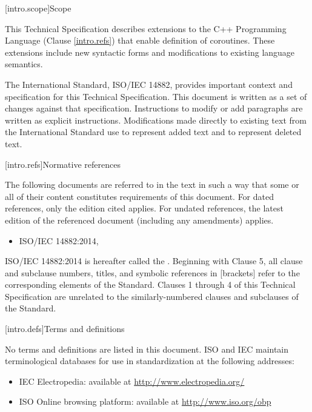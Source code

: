 
[intro.scope]{Scope}

\pnum
This Technical Specification describes extensions to the C++ 
Programming Language (Clause \ref{intro.refs}) that
enable definition of coroutines. These extensions include 
new syntactic forms and modifications to existing language semantics.

\pnum
The International Standard, ISO/IEC 14882, provides important context
and specification for this Technical Specification. This document is 
written as a set of changes against that specification. Instructions
to modify or add paragraphs are written as explicit instructions. 
Modifications made directly to existing text from the International
Standard use  to represent added text and
 to represent deleted text. 

[intro.refs]{Normative references}

\pnum
The following documents are referred to in the text in such a way that some or all of their content constitutes requirements of this document. For dated references, only the edition cited applies. For undated references, the latest edition of the referenced document (including any amendments) applies.

\begin{itemize}
	\item ISO/IEC 14882:2014, 
\end{itemize}

ISO/IEC 14882:2014 is hereafter called the .
%
Beginning with Clause 5, all clause and subclause numbers, titles,
and symbolic references in [brackets] refer to the corresponding elements of the \Cpp Standard. Clauses 1 through 4 of this Technical
Specification 
are unrelated to the similarly-numbered clauses and subclauses of the \Cpp Standard.


[intro.defs]{Terms and definitions}

No terms and definitions are listed in this document.
ISO and IEC maintain terminological databases for use in standardization at the following addresses:

\begin{itemize}
	\item IEC Electropedia: available at \url{http://www.electropedia.org/}
	\item ISO Online browsing platform: available at \url{http://www.iso.org/obp}
\end{itemize}

